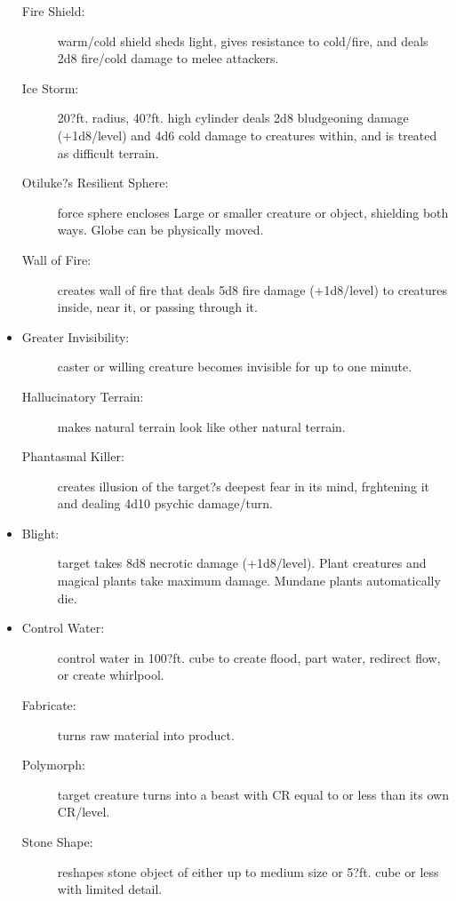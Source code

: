 \documentclass[DIV=14, paper=a4, fontsize=10pt, twocolumn, twoside]{scrartcl}
\begin{document}
\begin{itemize}[align=parleft,labelwidth=1cm]
\begin{description}
 \item[Fire Shield:] warm/cold shield sheds light, gives resistance to cold/fire, and deals 2d8 fire/cold damage to melee attackers.
 \item[Ice Storm:] 20?ft. radius, 40?ft. high cylinder deals 2d8 bludgeoning damage (+1d8/level) and 4d6 cold damage to creatures within, and is treated as difficult terrain.
 \item[Otiluke?s Resilient Sphere:] force sphere encloses Large or smaller creature or object, shielding both ways. Globe can be physically moved.
 \item[Wall of Fire:] creates wall of fire that deals 5d8 fire damage (+1d8/level) to creatures inside, near it, or passing through it.
\end{description}
\renewcommand{\labelitemi}{Illus}\item
\begin{description}
 \item[Greater Invisibility:] caster or willing creature becomes invisible for up to one minute.
 \item[Hallucinatory Terrain:] makes natural terrain look like other natural terrain.
 \item[Phantasmal Killer:] creates illusion of the target?s deepest fear in its mind, frghtening it and dealing 4d10 psychic damage/turn.
\end{description}
\renewcommand{\labelitemi}{Necro}\item
\begin{description}
 \item[Blight:] target takes 8d8 necrotic damage (+1d8/level). Plant creatures and magical plants take maximum damage. Mundane plants automatically die.
\end{description}
\renewcommand{\labelitemi}{Trans}\item
\begin{description}
 \item[Control Water:] control water in 100?ft. cube to create flood, part water, redirect flow, or create whirlpool.
 \item[Fabricate:] turns raw material into product.
 \item[Polymorph:] target creature turns into a beast with CR equal to or less than its own CR/level.
 \item[Stone Shape:] reshapes stone object of either up to medium size or 5?ft. cube or less with limited detail.
\end{description}
\end{itemize}
\end{document}
